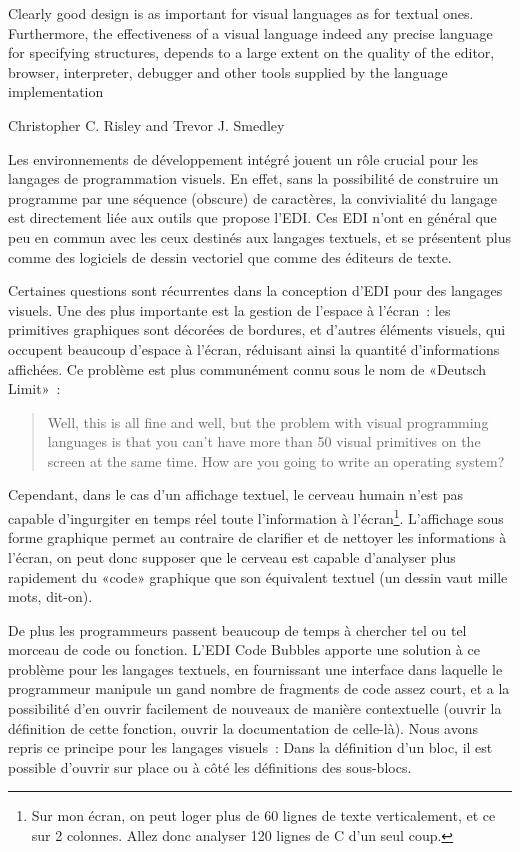 \documentclass{article}
\begin{document}
{
  \setlength{\epigraphwidth}{0.85\linewidth}
  \renewcommand{\textflush}{justify}
  \renewcommand{\epigraphflush}{center}
  \epigraph{
    Clearly good design is as important for visual languages as for textual ones. Furthermore, the effectiveness of a visual language indeed
    any precise language for specifying structures, depends to a large extent on the quality of the editor, browser, interpreter, debugger and
    other tools supplied by the language implementation
  }{Christopher C. Risley and Trevor J. Smedley \cite{the-editor-is-as-important-as-the-language}}
}

Les environnements de développement intégré jouent un rôle crucial pour les langages de programmation visuels. En effet, sans la possibilité
de construire un programme par une séquence (obscure) de caractères, la convivialité du langage est directement liée aux outils que propose
l'EDI. Ces EDI n'ont en général que peu en commun avec les ceux destinés aux langages textuels, et se présentent plus comme des logiciels de
dessin vectoriel que comme des éditeurs de texte.

Certaines questions sont récurrentes dans la conception d'EDI pour des langages visuels. Une des plus importante est la gestion de l'espace
à l'écran~: les primitives graphiques sont décorées de bordures, et d'autres éléments visuels, qui occupent beaucoup d'espace à l'écran,
réduisant ainsi la quantité d'informations affichées. Ce problème est plus communément connu sous le nom de «Deutsch
Limit»\cite{deutsch-limit}~:
\begin{quotation}
  Well, this is all fine and well, but the problem with visual programming languages is that you can’t have more than 50 visual primitives
  on the screen at the same time. How are you going to write an operating system?
\end{quotation}

Cependant, dans le cas d'un affichage textuel, le cerveau humain n'est pas capable d'ingurgiter en temps réel toute l'information à
l'écran\footnote{Sur mon écran, on peut loger plus de 60 lignes de texte verticalement, et ce sur 2 colonnes. Allez donc analyser 120 lignes
  de C d'un seul coup.}. L'affichage sous forme graphique permet au contraire de clarifier et de nettoyer les informations à l'écran, on
peut donc supposer que le cerveau est capable d'analyser plus rapidement du «code» graphique que son équivalent textuel (un dessin vaut
mille mots, dit-on).

De plus les programmeurs passent beaucoup de temps à chercher tel ou tel morceau de code ou fonction. L'EDI Code Bubbles\cite{code-bubbles}
apporte une solution à ce problème pour les langages textuels, en fournissant une interface dans laquelle le programmeur manipule un gand
nombre de fragments de code assez court, et a la possibilité d'en ouvrir facilement de nouveaux de manière contextuelle (ouvrir la
définition de cette fonction, ouvrir la documentation de celle-là). Nous avons repris ce principe pour les langages visuels~: Dans la
définition d'un bloc, il est possible d'ouvrir sur place ou à côté les définitions des sous-blocs.
\end{document}
